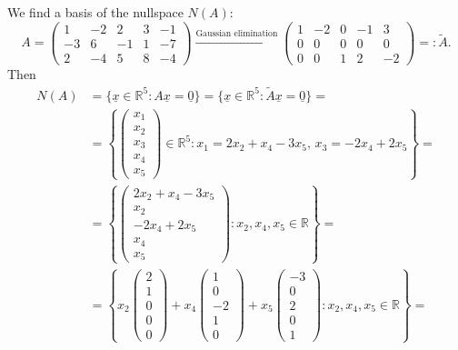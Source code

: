 \documentclass[
  12pt,
  a4paper,
  twoside]{article}
\theoremstyle{plain}
\theoremstyle{definition}
\begin{document}
We find a basis of the nullspace \(N(A)\):
\[
A = \begin{pmatrix} 1&-2&2&3&-1\\ -3&6&-1&1&-7\\ 2&-4&5&8&-4\end{pmatrix}
\xrightarrow{\text{Gaussian elimination}}
\begin{pmatrix} 1&-2&0&-1&3\\ 0&0&0&0&0\\ 0&0&1&2&-2\end{pmatrix} =: \tilde A.
\]
Then
\begin{align*}
N(A) &= \{\underline{x}\in\mathbb{R}^5 : A\underline{x} = \underline{0}\} = \{\underline{x}\in\mathbb{R}^5: \tilde A\underline{x} = \underline{0}\} =\\
&= \left\{\begin{pmatrix}x_1\\x_2\\x_3\\x_4\\x_5\end{pmatrix} \in\mathbb{R}^5: x_1=2x_2+x_4-3x_5,\, x_3=-2x_4+2x_5\right\} = \\
&= \left\{\begin{pmatrix}2x_2+x_4-3x_5\\x_2\\-2x_4+2x_5\\x_4\\x_5\end{pmatrix}: x_2,x_4,x_5\in\mathbb{R}\right\} = \\
&= \left\{x_2\begin{pmatrix}2\\1\\0\\0\\0\end{pmatrix} + x_4\begin{pmatrix} 1\\0\\-2\\1\\0 \end{pmatrix} + x_5\begin{pmatrix} -3\\0\\2\\0\\1\end{pmatrix}: x_2,x_4,x_5\in\mathbb{R} \right\}=\\

\end{align*}
\end{document}
